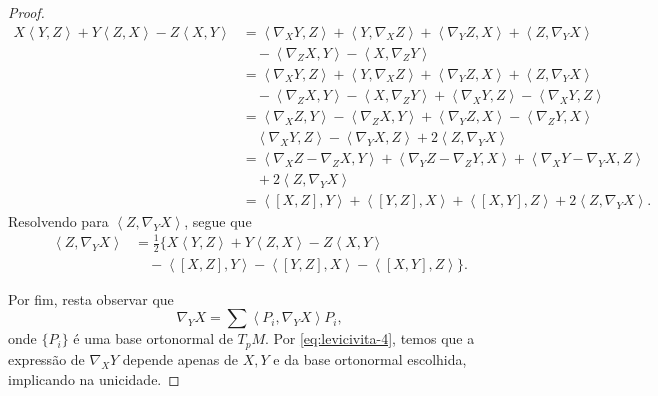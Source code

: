 \begin{theorem}
\begin{proof}
		\begin{align*}
			X\left<Y,Z\right> +Y\left<Z,X\right> -Z\left<X,Y\right> & = \left<\nabla_{X}Y,Z\right> +\left<Y,\nabla_{X}Z\right> + \left<\nabla_{Y}Z,X\right> + \left<Z,\nabla_{Y}X\right>       \\
			                                                        & \quad - \left<\nabla_{Z}X,Y\right> - \left<X,\nabla_{Z}Y\right>                                                          \\
			                                                        & = \left<\nabla_{X}Y,Z\right> +\left<Y,\nabla_{X}Z\right> + \left<\nabla_{Y}Z,X\right> + \left<Z,\nabla_{Y}X\right>       \\
			                                                        & \quad - \left<\nabla_{Z}X,Y\right> - \left<X,\nabla_{Z}Y\right>+ \left<\nabla_{X}Y,Z\right> - \left<\nabla_{X}Y,Z\right> \\
			                                                        & =\left<\nabla_{X}Z,Y\right>-\left<\nabla_{Z}X,Y\right> +\left<\nabla_{Y}Z,X\right> -\left<\nabla_{Z}Y,X\right>           \\
			                                                        & \quad \left<\nabla_{X}Y,Z\right> - \left<\nabla_{Y}X,Z\right> +2\left<Z,\nabla_{Y}X\right>                               \\
			                                                        & = \left<\nabla_{X}Z-\nabla_{Z}X,Y\right> + \left<\nabla_{Y}Z-\nabla_{Z}Y,X\right>+\left<\nabla_{X}Y-\nabla_{Y}X,Z\right> \\
			                                                        & \quad +2 \left<Z,\nabla_{Y}X\right>                                                                                      \\
			                                                        & = \left<[X,Z],Y\right> + \left<[Y,Z],X\right> +\left<[X,Y],Z\right> +2 \left<Z,\nabla_{Y}X\right>.
		\end{align*}
		Resolvendo para $\left<Z,\nabla_{Y}X\right>$, segue que
		\begin{align}
			\left<Z,\nabla_{Y}X\right> & =\frac{1}{2} \{X\left<Y,Z\right> +Y\left<Z,X\right> -Z\left<X,Y\right>                \nonumber        \\
			                           & \quad - \left<[X,Z],Y\right> - \left<[Y,Z],X\right> -\left<[X,Y],Z\right>  \}. \label{eq:levicivita-4}
		\end{align}

		Por fim, resta observar que
		\begin{equation*}
			\nabla_{Y}X = \sum \left<P_{i},\nabla_{Y}X\right> P_{i},
		\end{equation*}
		onde $\{ P_{i} \}$ é uma base ortonormal de $T_{p}M$. Por \eqref{eq:levicivita-4}, temos que a expressão de $\nabla_{X}Y$ depende apenas de $X, Y$ e da base ortonormal escolhida, implicando na unicidade.


\end{proof}
\end{theorem}
